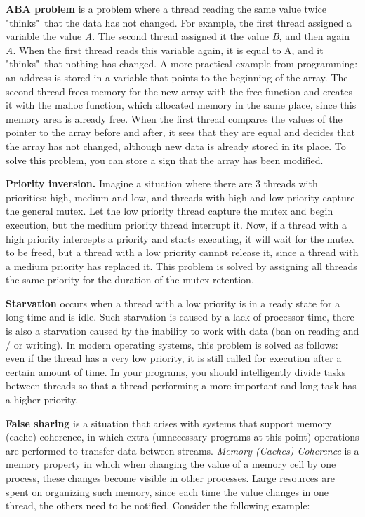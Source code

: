 {	\par\textbf{ABA problem} is a problem where a thread reading the same value twice "thinks"\ that the data has not changed. For example, the first thread assigned a variable the value \textit{A}. The second thread assigned it the value \textit{B}, and then again \textit{A}. When the first thread reads this variable again, it is equal to A, and it "thinks"\ that nothing has changed. A more practical example from programming: an address is stored in a variable that points to the beginning of the array. The second thread frees memory for the new array with the free function and creates it with the malloc function, which allocated memory in the same place, since this memory area is already free. When the first thread compares the values of the pointer to the array before and after, it sees that they are equal and decides that the array has not changed, although new data is already stored in its place. To solve this problem, you can store a sign that the array has been modified.
	\par\textbf{Priority inversion.} Imagine a situation where there are 3 threads with priorities: high, medium and low, and threads with high and low priority capture the general mutex. Let the low priority thread capture the mutex and begin execution, but the medium priority thread interrupt it. Now, if a thread with a high priority intercepts a priority and starts executing, it will wait for the mutex to be freed, but a thread with a low priority cannot release it, since a thread with a medium priority has replaced it. This problem is solved by assigning all threads the same priority for the duration of the mutex retention.
	\par\textbf{Starvation} occurs when a thread with a low priority is in a ready state for a long time and is idle. Such starvation is caused by a lack of processor time, there is also a starvation caused by the inability to work with data (ban on reading and / or writing). In modern operating systems, this problem is solved as follows: even if the thread has a very low priority, it is still called for execution after a certain amount of time. In your programs, you should intelligently divide tasks between threads so that a thread performing a more important and long task has a higher priority.
	\par\textbf{False sharing} is a situation that arises with systems that support memory (cache) coherence, in which extra (unnecessary programs at this point) operations are performed to transfer data between streams. \textit{Memory (Caches) Coherence} is a memory property in which when changing the value of a memory cell by one process, these changes become visible in other processes. Large resources are spent on organizing such memory, since each time the value changes in one thread, the others need to be notified. Consider the following example:
}
